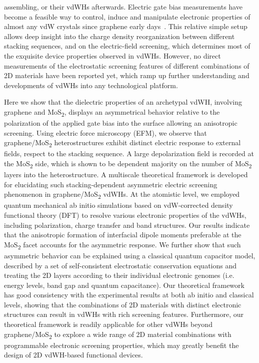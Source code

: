 assembling, or their vdWHs afterwards. Electric gate bias measurements
have become a feasible way to control, induce and manipulate
electronic properties of almost any vdW crystals since graphene early
days~\cite{Novoselov_2004_gr,Zhang_2005_QHE,Novoselov_2005_massless}.
%
This
relative simple setup allows deep insight into the charge density
reorganization between different stacking sequences, and on the
electric-field screening, which determines most of the exquisite
device properties observed in vdWHs. However, no direct measurements
of the electrostatic screening features of different combinations of
2D materials have been reported yet, which ramp up further
understanding and developments of vdWHs into any technological
platform.

Here we show that the dielectric properties of an
archetypal vdWH, involving graphene and MoS\textsubscript{2}, displays an asymmetrical
behavior relative to the polarization of the applied gate bias into
the surface allowing an anisotropic screening. Using electric force
microscopy (EFM), we observe that graphene/MoS\textsubscript{2} heterostructures
exhibit distinct electric response to external fields, respect to the
stacking sequence. A large depolarization field is recorded at the
MoS\textsubscript{2} side, which is shown to be dependent majority on the number of
MoS\textsubscript{2} layers into the heterostructure. A multiscale theoretical
framework is developed for elucidating such stacking-dependent
asymmetric electric screening phenomenon in graphene/MoS\textsubscript{2} vdWHs. At
the atomistic level, we employed quantum mechanical ab initio
simulations based on vdW-corrected density functional theory (DFT) to
resolve various electronic properties of the vdWHs, including
polarization, charge transfer and band structures. Our results
indicate that the anisotropic formation of interfacial dipole moments
preferable at the MoS\textsubscript{2} facet accounts for the asymmetric response. We
further show that such asymmetric behavior can be explained using a
classical quantum capacitor model, described by a set of
self-consistent electrostatic conservation equations and treating the
2D layers according to their individual electronic genomes
(i.e. energy levels, band gap and quantum capacitance). Our
theoretical framework has good consistency with the experimental
results at both ab initio and classical levels, showing that the
combinations of 2D materials with distinct electronic structures can
result in vdWHs with rich screening features. Furthermore, our
theoretical framework is readily applicable for other vdWHs beyond
graphene/MoS\textsubscript{2} to explore a wide range of 2D material combinations with
programmable electronic screening properties, which may greatly
benefit the design of 2D vdWH-based functional devices.

